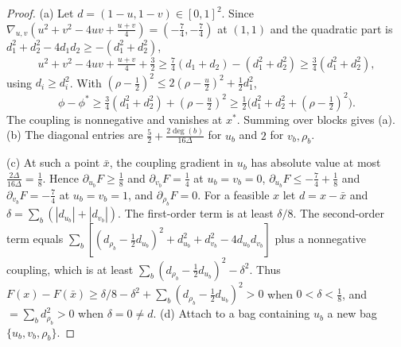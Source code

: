 \begin{proof}
(a) Let $d=(1-u,1-v)\in[0,1]^2$. Since $\nabla_{u,v}(u^2+v^2-4uv+\frac{u+v}4)
=(-\frac74,-\frac74)$ at $(1,1)$ and the quadratic part is $d_1^2+d_2^2-4d_1d_2
\ge-(d_1^2+d_2^2)$,
\[
u^2+v^2-4uv+\tfrac{u+v}4+\tfrac32\ge\tfrac74(d_1+d_2)-(d_1^2+d_2^2)
\ge\tfrac34(d_1^2+d_2^2),
\]
using $d_i\ge d_i^2$. With $(\rho-\frac12)^2\le2(\rho-\frac u2)^2+\frac12d_1^2$,
\[
\phi-\phi^*\ge\tfrac34(d_1^2+d_2^2)+(\rho-\tfrac u2)^2
\ge\tfrac12\bigl(d_1^2+d_2^2+(\rho-\tfrac12)^2\bigr).
\]
The coupling is nonnegative and vanishes at $x^*$. Summing over blocks gives
(a). (b) The diagonal entries are $\frac52+\frac{2\deg(b)}{16\Delta}$ for
$u_b$ and $2$ for $v_b,\rho_b$.

(c) At such a point $\bar x$, the coupling gradient in $u_b$ has absolute
value at most $\frac{2\Delta}{16\Delta}=\frac18$. Hence $\partial_{u_b}F\ge\frac18$
and $\partial_{v_b}F=\frac14$ at $u_b=v_b=0$, $\partial_{u_b}F\le-\frac74+\frac18$
and $\partial_{v_b}F=-\frac74$ at $u_b=v_b=1$, and $\partial_{\rho_b}F=0$. For a
feasible $x$ let $d=x-\bar x$ and $\delta=\sum_b(|d_{u_b}|+|d_{v_b}|)$. The
first-order term is at least $\delta/8$. The second-order term equals
$\sum_b[(d_{\rho_b}-\frac12d_{u_b})^2+d_{u_b}^2+d_{v_b}^2-4d_{u_b}d_{v_b}]$ plus a
nonnegative coupling, which is at least
$\sum_b(d_{\rho_b}-\frac12d_{u_b})^2-\delta^2$. Thus
$F(x)-F(\bar x)\ge\delta/8-\delta^2+\sum_b(d_{\rho_b}-\frac12d_{u_b})^2>0$ when
$0<\delta<\frac18$, and $=\sum_bd_{\rho_b}^2>0$ when $\delta=0\ne d$.
(d) Attach to a bag containing $u_b$ a new bag $\{u_b,v_b,\rho_b\}$.
\end{proof}
